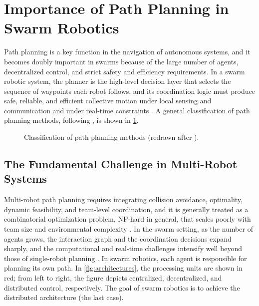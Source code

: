 \section{Importance of Path Planning in Swarm Robotics}\label{sec:importance}

Path planning is a key function in the navigation of autonomous systems, and it
becomes doubly important in swarms because of the large number of agents,
decentralized control, and strict safety and efficiency requirements. In a swarm
robotic system, the planner is the high-level decision layer that selects the
sequence of waypoints each robot follows, and its coordination logic must produce
safe, reliable, and efficient collective motion under local sensing and
communication and under real-time constraints
\cite{nguyen2024swarm,lin2022review,abujabal2024path}. A general classification of
path planning methods, following \cite{abujabal2024path}, is shown in
\cref{fig:taxonomy}.

\begin{figure}[htbp]
  \centering
  \caption{Classification of path planning methods (redrawn after \cite{abujabal2024path}).}
  \label{fig:taxonomy}
\end{figure}

\subsection{The Fundamental Challenge in Multi-Robot Systems}

Multi-robot path planning requires integrating collision avoidance, optimality,
dynamic feasibility, and team-level coordination, and it is generally treated as
a combinatorial optimization problem, NP-hard in general, that scales poorly with
team size and environmental complexity \cite{lin2022review}. In the swarm setting,
as the number of agents grows, the interaction graph and the coordination
decisions expand sharply, and the computational and real-time challenges
intensify well beyond those of single-robot planning
\cite{nguyen2024swarm,lin2022review,abujabal2024path}. In swarm robotics, each agent is
responsible for planning its own path. In \cref{fig:architectures}, the
processing units are shown in red; from left to right, the figure depicts
centralized, decentralized, and distributed control, respectively. The goal of
swarm robotics is to achieve the distributed architecture (the last case).

